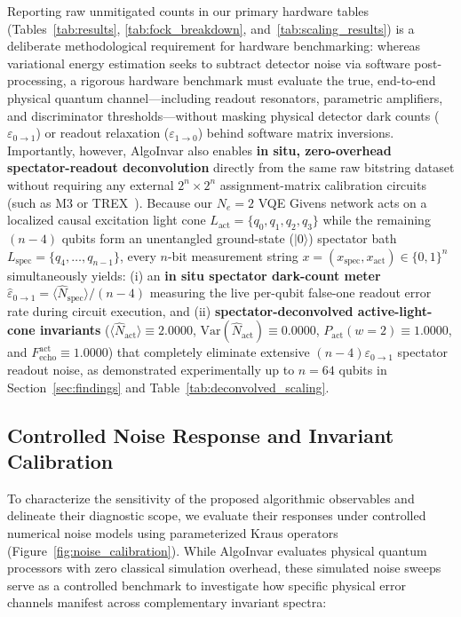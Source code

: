 \documentclass[aps,pra,reprint,superscriptaddress,floatfix,nofootinbib]{revtex4-2}
\begin{document}
Reporting raw unmitigated counts in our primary hardware tables (Tables~\ref{tab:results}, \ref{tab:fock_breakdown}, and~\ref{tab:scaling_results}) is a deliberate methodological requirement for hardware benchmarking: whereas variational energy estimation seeks to subtract detector noise via software post-processing, a rigorous hardware benchmark must evaluate the true, end-to-end physical quantum channel---including readout resonators, parametric amplifiers, and discriminator thresholds---without masking physical detector dark counts ($\varepsilon_{0\to 1}$) or readout relaxation ($\varepsilon_{1\to 0}$) behind software matrix inversions. Importantly, however, AlgoInvar also enables \textbf{in situ, zero-overhead spectator-readout deconvolution} directly from the same raw bitstring dataset without requiring any external $2^n \times 2^n$ assignment-matrix calibration circuits (such as M3 or TREX~\cite{Nation2021}). Because our $N_e = 2$ VQE Givens network acts on a localized causal excitation light cone $L_{\text{act}} = \{q_0, q_1, q_2, q_3\}$ while the remaining $(n - 4)$ qubits form an unentangled ground-state ($|0\rangle$) spectator bath $L_{\text{spec}} = \{q_4, \dots, q_{n-1}\}$, every $n$-bit measurement string $x = (x_{\text{spec}}, x_{\text{act}}) \in \{0,1\}^n$ simultaneously yields: (i) an \textbf{in situ spectator dark-count meter} $\hat{\varepsilon}_{0\to 1} = \langle \hat{N}_{\text{spec}} \rangle / (n - 4)$ measuring the live per-qubit false-one readout error rate during circuit execution, and (ii) \textbf{spectator-deconvolved active-light-cone invariants} ($\langle \hat{N}_{\text{act}} \rangle \equiv 2.0000$, $\text{Var}(\hat{N}_{\text{act}}) \equiv 0.0000$, $P_{\text{act}}(w=2) \equiv 1.0000$, and $F_{\text{echo}}^{\text{act}} \equiv 1.0000$) that completely eliminate extensive $(n - 4)\varepsilon_{0\to 1}$ spectator readout noise, as demonstrated experimentally up to $n = 64$ qubits in Section~\ref{sec:findings} and Table~\ref{tab:deconvolved_scaling}.


\subsection{Controlled Noise Response and Invariant Calibration}
To characterize the sensitivity of the proposed algorithmic observables and delineate their diagnostic scope, we evaluate their responses under controlled numerical noise models using parameterized Kraus operators (Figure~\ref{fig:noise_calibration}). While AlgoInvar evaluates physical quantum processors with zero classical simulation overhead, these simulated noise sweeps serve as a controlled benchmark to investigate how specific physical error channels manifest across complementary invariant spectra:
\end{document}
